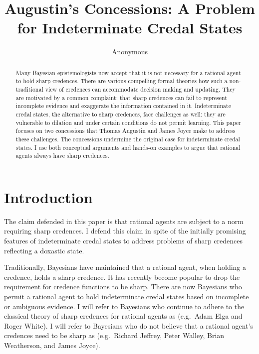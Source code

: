 \documentclass[11pt]{article}
\begin{document}
\title{Augustin's Concessions: A Problem for Indeterminate Credal States}

\author{Anonymous}

\maketitle

\doublespacing

\begin{abstract}
  {\noindent}Many Bayesian epistemologists now accept that it is not
  necessary for a rational agent to hold sharp credences. There are
  various compelling formal theories how such a non-traditional view
  of credences can accommodate decision making and updating. They are
  motivated by a common complaint: that sharp credences can fail to
  represent incomplete evidence and exaggerate the information
  contained in it. Indeterminate credal states, the alternative to
  sharp credences, face challenges as well: they are vulnerable to
  dilation and under certain conditions do not permit learning. This
  paper focuses on two concessions that Thomas Augustin and James
  Joyce make to address these challenges. The concessions undermine
  the original case for indeterminate credal states. I use both
  conceptual arguments and hands-on examples to argue that rational
  agents always have sharp credences.
\end{abstract}

\section{Introduction}
\label{Introduction}

\renewcommand{\labelitemi}{$\bullet$}

The claim defended in this paper is that rational agents are subject
to a norm requiring sharp credences. I defend this claim in spite of
the initially promising features of indeterminate credal states to
address problems of sharp credences reflecting a doxastic state.

Traditionally, Bayesians have maintained that a rational agent, when
holding a credence, holds a sharp credence. It has recently become
popular to drop the requirement for credence functions to be sharp.
There are now Bayesians who permit a rational agent to hold
indeterminate credal states based on incomplete or ambiguous evidence.
I will refer to Bayesians who continue to adhere to the classical
theory of sharp credences for rational agents as 
(e.g.\ Adam Elga and Roger White). I will refer to Bayesians who do
not believe that a rational agent's credences need to be sharp as
 (e.g.\ Richard Jeffrey, Peter Walley, Brian
Weatherson, and James Joyce).
\end{document}
